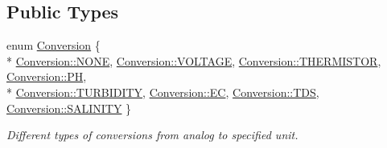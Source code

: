 \subsection*{Public Types}
\begin{DoxyCompactItemize}
\item 
enum \hyperlink{class_loom___analog_a83079adfd115a272351323429cefad46}{Conversion} \{ \\*
\hyperlink{class_loom___analog_a83079adfd115a272351323429cefad46ab50339a10e1de285ac99d4c3990b8693}{Conversion\+::\+N\+O\+NE}, 
\hyperlink{class_loom___analog_a83079adfd115a272351323429cefad46ad19d26898eee98e71fc8b0ad69bb898b}{Conversion\+::\+V\+O\+L\+T\+A\+GE}, 
\hyperlink{class_loom___analog_a83079adfd115a272351323429cefad46ada003223c47c56d9514ec438a602ae43}{Conversion\+::\+T\+H\+E\+R\+M\+I\+S\+T\+OR}, 
\hyperlink{class_loom___analog_a83079adfd115a272351323429cefad46aa25496ebf095e4198da4088449c83ac6}{Conversion\+::\+PH}, 
\\*
\hyperlink{class_loom___analog_a83079adfd115a272351323429cefad46a3a6ff147d93a7b2d56cf875994d33775}{Conversion\+::\+T\+U\+R\+B\+I\+D\+I\+TY}, 
\hyperlink{class_loom___analog_a83079adfd115a272351323429cefad46a3fd6b696867d70225deda7868308679b}{Conversion\+::\+EC}, 
\hyperlink{class_loom___analog_a83079adfd115a272351323429cefad46a7a323371ef1444029ad6c74cd68809dd}{Conversion\+::\+T\+DS}, 
\hyperlink{class_loom___analog_a83079adfd115a272351323429cefad46a8ed43df473ba4db0ebe07e408199d5be}{Conversion\+::\+S\+A\+L\+I\+N\+I\+TY}
 \}\begin{DoxyCompactList}\small\item\em Different types of conversions from analog to specified unit. \end{DoxyCompactList}
\end{DoxyCompactItemize}
